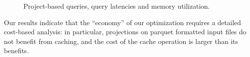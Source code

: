 \begin{figure}[ht]
	\centering



   \caption{Project-based queries, query latencies and memory utilization.}
   \label{fig:query3}
\end{figure}

Our results indicate that the ``economy'' of our optimization requires a detailed cost-based analysis: in particular, projections on parquet formatted input files do not benefit from caching, and the cost of the cache operation is larger than its benefits.

